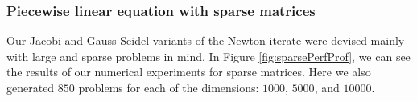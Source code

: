 \documentclass[11pt]{article}
\begin{document}


\subsubsection{Piecewise linear equation with sparse matrices} \label{sparsePWL}

Our Jacobi and Gauss-Seidel variants of the Newton iterate were devised mainly with large and sparse problems in mind. In Figure \ref{fig:sparsePerfProf}, we can see the results of our numerical experiments for sparse matrices. Here we also generated $850$ problems for each of the dimensions: $1000$, $5000$, and $10000$.
\end{document}
